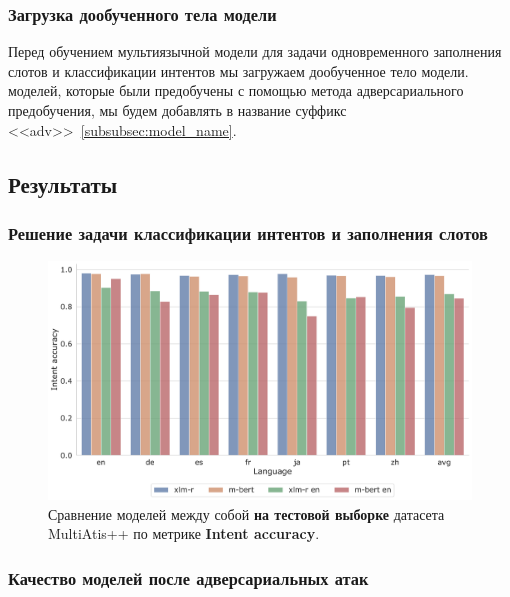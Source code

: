 \subsubsection{Загрузка дообученного тела модели}
Перед обучением мультиязычной модели для задачи одновременного заполнения слотов и классификации интентов мы загружаем дообученное тело модели.
 моделей, которые были предобучены с помощью метода адверсариального предобучения, мы будем добавлять в название суффикс <<adv>>~\eqref{subsubsec:model_name}.

\subsection{Результаты}


\subsubsection{Решение задачи классификации интентов и заполнения слотов}

\begin{figure}[H]
    \centering
    \includegraphics[width=\textwidth]{images/0}
    \caption{Сравнение моделей между собой \textbf{на тестовой выборке} датасета MultiAtis++ по метрике \textbf{Intent accuracy}.}\label{fig:figure0}
\end{figure}


\subsubsection{Качество моделей после адверсариальных атак}

